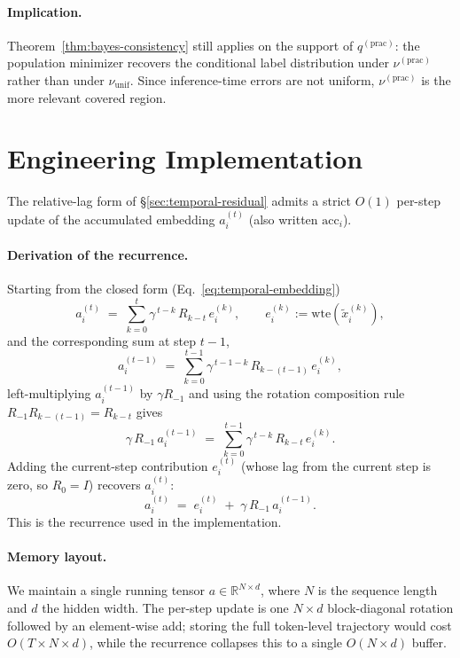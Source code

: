 \documentclass{llmxive}
\begin{document}
\paragraph{Implication.}
Theorem~\ref{thm:bayes-consistency} still applies on the support of $q^{(\mathrm{prac})}$: the population minimizer recovers the conditional label distribution under $\nu^{(\mathrm{prac})}$ rather than under $\nu_{\mathrm{unif}}$. Since inference-time errors are not uniform, $\nu^{(\mathrm{prac})}$ is the more relevant covered region.

\section{Engineering Implementation}
\label{app:rope-engineering}

The relative-lag form of \S\ref{sec:temporal-residual} admits a strict $O(1)$ per-step update of the accumulated embedding $a_i^{(t)}$ (also written $\mathrm{acc}_i$).

\paragraph{Derivation of the recurrence.}
Starting from the closed form (Eq.~\eqref{eq:temporal-embedding})
\[
a_i^{(t)} \;=\; \sum_{k=0}^{t} \gamma^{\,t-k}\, R_{k-t}\, e_i^{(k)},
\qquad
e_i^{(k)} := \mathrm{wte}(\tilde{x}_i^{(k)}),
\]
and the corresponding sum at step $t-1$,
\[
a_i^{(t-1)} \;=\; \sum_{k=0}^{t-1} \gamma^{\,t-1-k}\, R_{k-(t-1)}\, e_i^{(k)},
\]
left-multiplying $a_i^{(t-1)}$ by $\gamma R_{-1}$ and using the rotation composition rule $R_{-1} R_{k-(t-1)} = R_{k-t}$ gives
\[
\gamma\, R_{-1}\, a_i^{(t-1)} \;=\; \sum_{k=0}^{t-1} \gamma^{\,t-k}\, R_{k-t}\, e_i^{(k)}.
\]
Adding the current-step contribution $e_i^{(t)}$ (whose lag from the current step is zero, so $R_0 = I$) recovers $a_i^{(t)}$:
\[
a_i^{(t)} \;=\; e_i^{(t)} \;+\; \gamma\, R_{-1}\, a_i^{(t-1)}.
\]
This is the recurrence used in the implementation.

\paragraph{Memory layout.}
We maintain a single running tensor $a \in \mathbb{R}^{N \times d}$, where $N$ is the sequence length and $d$ the hidden width. The per-step update is one $N \times d$ block-diagonal rotation followed by an element-wise add; storing the full token-level trajectory would cost $O(T \times N \times d)$, while the recurrence collapses this to a single $O(N \times d)$ buffer.
\end{document}
